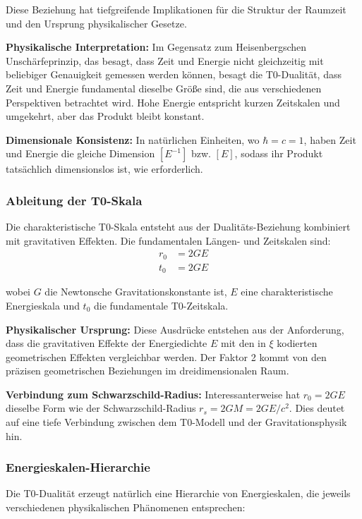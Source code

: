 \documentclass[12pt,a4paper]{article}
\newcommand{\Tzero}{t_0}
\newcommand{\xigeom}{\xi}
\begin{document}
	Diese Beziehung hat tiefgreifende Implikationen für die Struktur der Raumzeit und den Ursprung physikalischer Gesetze.
	
	\textbf{Physikalische Interpretation:} Im Gegensatz zum Heisenbergschen Unschärfeprinzip, das besagt, dass Zeit und Energie nicht gleichzeitig mit beliebiger Genauigkeit gemessen werden können, besagt die T0-Dualität, dass Zeit und Energie fundamental dieselbe Größe sind, die aus verschiedenen Perspektiven betrachtet wird. Hohe Energie entspricht kurzen Zeitskalen und umgekehrt, aber das Produkt bleibt konstant.
	
	\textbf{Dimensionale Konsistenz:} In natürlichen Einheiten, wo $\hbar = c = 1$, haben Zeit und Energie die gleiche Dimension $[E^{-1}]$ bzw. $[E]$, sodass ihr Produkt tatsächlich dimensionslos ist, wie erforderlich.
	
	\subsubsection{Ableitung der T0-Skala}
	
	Die charakteristische T0-Skala entsteht aus der Dualitäts-Beziehung kombiniert mit gravitativen Effekten. Die fundamentalen Längen- und Zeitskalen sind:
	\begin{align}
		r_0 &= 2GE \\
		\Tzero &= 2GE
	\end{align}
	
	wobei $G$ die Newtonsche Gravitationskonstante ist, $E$ eine charakteristische Energieskala und $\Tzero$ die fundamentale T0-Zeitskala.
	
	\textbf{Physikalischer Ursprung:} Diese Ausdrücke entstehen aus der Anforderung, dass die gravitativen Effekte der Energiedichte $E$ mit den in $\xigeom$ kodierten geometrischen Effekten vergleichbar werden. Der Faktor 2 kommt von den präzisen geometrischen Beziehungen im dreidimensionalen Raum.
	
	\textbf{Verbindung zum Schwarzschild-Radius:} Interessanterweise hat $r_0 = 2GE$ dieselbe Form wie der Schwarzschild-Radius $r_s = 2GM = 2GE/c^2$. Dies deutet auf eine tiefe Verbindung zwischen dem T0-Modell und der Gravitationsphysik hin.
	
	\subsubsection{Energieskalen-Hierarchie}
	
	Die T0-Dualität erzeugt natürlich eine Hierarchie von Energieskalen, die jeweils verschiedenen physikalischen Phänomenen entsprechen:
	
\end{document}
